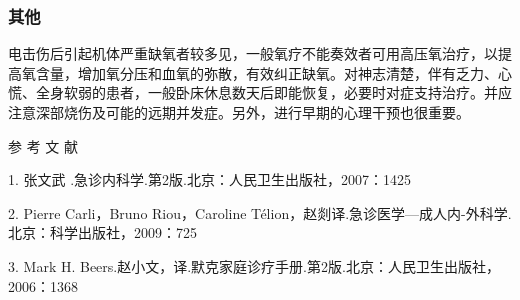 \subsubsection{其他}

电击伤后引起机体严重缺氧者较多见，一般氧疗不能奏效者可用高压氧治疗，以提高氧含量，增加氧分压和血氧的弥散，有效纠正缺氧。对神志清楚，伴有乏力、心慌、全身软弱的患者，一般卧床休息数天后即能恢复，必要时对症支持治疗。并应注意深部烧伤及可能的远期并发症。另外，进行早期的心理干预也很重要。

\protect\hypertarget{text00362.html}{}{}

\hypertarget{text00362.htmlux5cux23CHP15-5-4}{}
参 考 文 献

1. 张文武 .急诊内科学.第2版.北京：人民卫生出版社，2007：1425

2. Pierre Carli，Bruno Riou，Caroline
Télion，赵剡译.急诊医学---成人内-外科学.北京：科学出版社，2009：725

3. Mark H.
Beers.赵小文，译.默克家庭诊疗手册.第2版.北京：人民卫生出版社，2006：1368

\protect\hypertarget{text00363.html}{}{}


